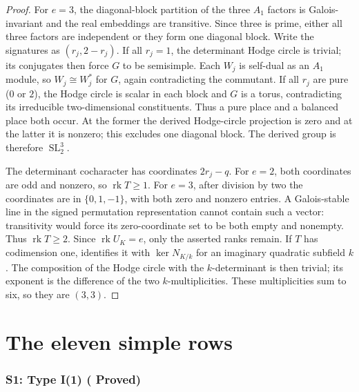 \documentclass[10pt,reqno]{article}
\theoremstyle{emphasizedplain}
\DeclareRobustCommand{\provedstatus}{%
  \texorpdfstring{\textcolor{ProvedGreen}{\textbf{Proved}}}{Proved}}
\theoremstyle{emphasizeddefinition}
\theoremstyle{emphasizeddefinition}
\DeclareMathOperator{\SL}{SL}
\DeclareMathOperator{\rk}{rk}
\begin{document}
\begin{proof}
For $e=3$, the diagonal-block partition of the three $A_1$ factors is
Galois-invariant and the real embeddings are transitive. Since three
is prime, either all three factors are independent or they form one
diagonal block. Write the signatures as $(r_j,2-r_j)$.
If all $r_j=1$, the determinant Hodge circle is trivial; its conjugates
then force $G$ to be semisimple. Each $W_j$ is self-dual as an $A_1$
module, so $W_j\cong W_j^*$ for $G$, again contradicting the commutant.
If all $r_j$ are pure ($0$ or $2$), the Hodge circle is scalar in each
block and $G$ is a torus, contradicting its irreducible two-dimensional
constituents. Thus a pure place and a balanced place both occur.
At the former the derived Hodge-circle projection is zero and at the
latter it is nonzero; this excludes one diagonal block. The derived
group is therefore $\SL_2^3$.

The determinant cocharacter has coordinates $2r_j-q$.
For $e=2$, both coordinates are odd and nonzero, so $\rk T\geq1$.
For $e=3$, after division by two the coordinates are in $\{0,1,-1\}$,
with both zero and nonzero entries. A Galois-stable line in the signed
permutation representation cannot contain such a vector: transitivity
would force its zero-coordinate set to be both empty and nonempty.
Thus $\rk T\geq2$. Since $\rk U_K=e$, only the asserted ranks remain.
If $T$ has codimension one, \cite[Lemma (3.7)]{MZ} identifies it with
$\ker N_{K/k}$ for an imaginary quadratic subfield $k$.
The composition of the Hodge circle with the $k$-determinant is then
trivial; its exponent is the difference of the two $k$-multiplicities.
These multiplicities sum to six, so they are $(3,3)$.
\end{proof}

\part{The eleven simple rows}
\section{S1: Type I(1) (\provedstatus)}\label{sec:S1}
\end{document}

